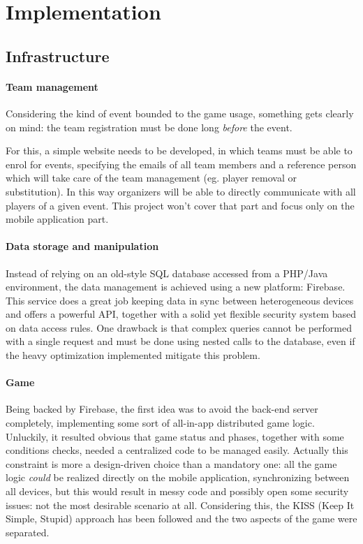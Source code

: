 \chapter{Implementation}

	\section{Infrastructure}
		
		\subsubsection{Team management}
		
			Considering the kind of event bounded to the game usage, something gets clearly on mind: the team registration must be done long \emph{before} the event.
			
			For this, a simple website needs to be developed, in which teams must be able to enrol for events, specifying the emails of all team members and a reference person which will take care of the team management (eg. player removal or substitution).
			In this way organizers will be able to directly communicate with all players of a given event.
			This project won't cover that part and focus only on the mobile application part.
		
		\subsubsection{Data storage and manipulation}
			
			Instead of relying on an old-style SQL database accessed from a PHP/Java environment, the data management is achieved using a new platform: Firebase.
			This service does a great job keeping data in sync between heterogeneous devices and offers a powerful API, together with a solid yet flexible security system based on data access rules.
			One drawback is that complex queries cannot be performed with a single request and must be done using nested calls to the database, even if the heavy optimization implemented mitigate this problem.
		
		\subsubsection{Game}
		
			Being backed by Firebase, the first idea was to avoid the back-end server completely, implementing some sort of all-in-app distributed game logic.
			Unluckily, it resulted obvious that game status and phases, together with some conditions checks, needed a centralized code to be managed easily.
			Actually this constraint is more a design-driven choice than a mandatory one: all the game logic \emph{could} be realized directly on the mobile application, synchronizing between all devices, but this would result in messy code and possibly open some security issues: not the most desirable scenario at all.
			Considering this, the KISS (Keep It Simple, Stupid) approach has been followed and the two aspects of the game were separated.
			
